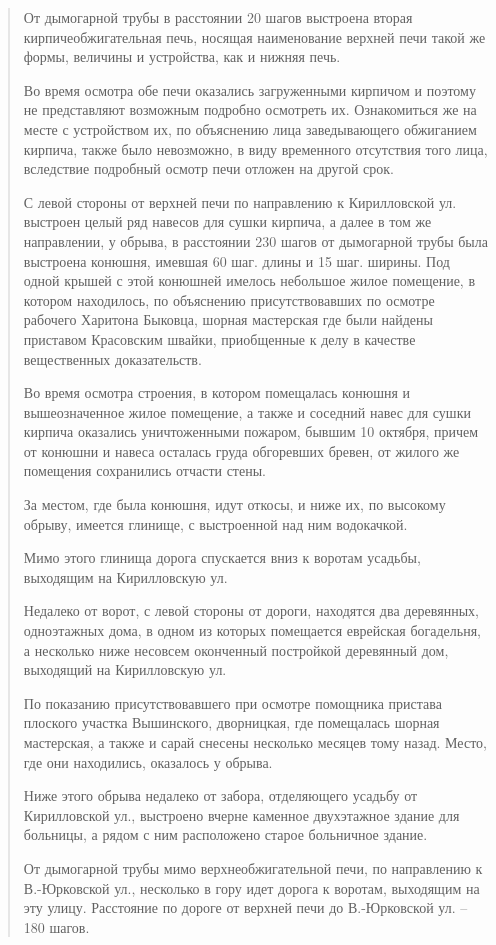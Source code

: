 \begin{quotation}
От дымогарной трубы в расстоянии 20 шагов выстроена вторая кирпичеобжигательная печь, носящая наименование верхней печи такой же формы, величины и устройства, как и нижняя печь.

Во время осмотра обе печи оказались загруженными кирпичом и поэтому не представляют возможным подробно осмотреть их. Ознакомиться же на месте с устройством их, по объяснению лица заведывающего обжиганием кирпича, также было невозможно, в виду временного отсутствия того лица, вследствие подробный осмотр печи отложен на другой срок.

С левой стороны от верхней печи по направлению к Кирилловской ул. выстроен целый ряд навесов для сушки кирпича, а далее в том же направлении, у обрыва, в расстоянии 230 шагов от дымогарной трубы была выстроена конюшня, имевшая 60 шаг. длины и 15 шаг. ширины. Под одной крышей с этой конюшней имелось небольшое жилое помещение, в котором находилось, по объяснению присутствовавших по осмотре рабочего Харитона Быковца, шорная мастерская где были найдены приставом Красовским швайки, приобщенные к делу в качестве вещественных доказательств.

Во время осмотра строения, в котором помещалась конюшня и вышеозначенное жилое помещение, а также и соседний навес для сушки кирпича оказались уничтоженными пожаром, бывшим 10 октября, причем от конюшни и навеса осталась груда обгоревших бревен, от жилого же помещения сохранились отчасти стены.

За местом, где была конюшня, идут откосы, и ниже их, по высокому обрыву, имеется глинище, с выстроенной над ним водокачкой.

Мимо этого глинища дорога спускается вниз к воротам усадьбы, выходящим на Кирилловскую ул. 

Недалеко от ворот, с левой стороны от дороги, находятся два деревянных, одноэтажных дома, в одном из которых помещается еврейская богадельня, а несколько ниже несовсем оконченный постройкой деревянный дом, выходящий на Кирилловскую ул.

По показанию присутствовавшего при осмотре помощника пристава плоского участка Вышинского, дворницкая, где помещалась шорная мастерская, а также и сарай снесены нес\-колько месяцев тому назад. Место, где они находились, оказалось у обрыва.

Ниже этого обрыва недалеко от забора, отделяющего усадьбу от Кирилловской ул., выстроено вчерне каменное двухэтажное здание для больницы, а рядом с ним расположено старое больничное здание.

От дымогарной трубы мимо верхнеобжигательной печи, по направлению к В.-Юрковской ул., несколько в гору идет дорога к воротам, выходящим на эту улицу. Расстояние по дороге от верхней печи до В.-Юрко\-вской ул. – 180 шагов.


\end{quotation}
